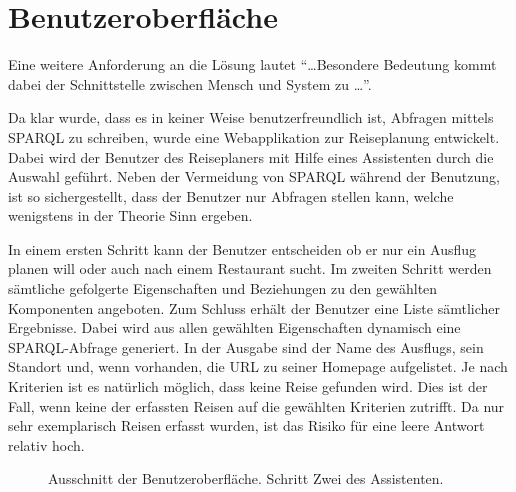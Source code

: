 \section{Benutzeroberfläche}
\label{sec:loesung_gui}
Eine weitere Anforderung an die Lösung lautet ``\ldots Besondere Bedeutung kommt dabei der Schnittstelle zwischen Mensch und System zu \ldots''.~\cite{Aufgabenstellung}

Da klar wurde, dass es in keiner Weise benutzerfreundlich ist, Abfragen mittels SPARQL zu schreiben, wurde eine Webapplikation zur Reiseplanung entwickelt. Dabei wird der Benutzer des Reiseplaners mit Hilfe eines Assistenten durch die Auswahl geführt. Neben der Vermeidung von SPARQL während der Benutzung, ist so sichergestellt, dass der Benutzer nur Abfragen stellen kann, welche wenigstens in der Theorie Sinn ergeben.

In einem ersten Schritt kann der Benutzer entscheiden ob er nur ein Ausflug planen will oder auch nach einem Restaurant sucht. Im zweiten Schritt werden sämtliche gefolgerte Eigenschaften und Beziehungen zu den gewählten Komponenten angeboten. Zum Schluss erhält der Benutzer eine Liste sämtlicher Ergebnisse. Dabei wird aus allen gewählten Eigenschaften dynamisch eine SPARQL-Abfrage generiert. In der Ausgabe sind der Name des Ausflugs, sein Standort und, wenn vorhanden, die URL zu seiner Homepage aufgelistet. Je nach Kriterien ist es natürlich möglich, dass keine Reise gefunden wird. Dies ist der Fall, wenn keine der erfassten Reisen auf die gewählten Kriterien zutrifft. Da nur sehr exemplarisch Reisen erfasst wurden, ist das Risiko für eine leere Antwort relativ hoch.
\begin{figure}[H]
\centering {}
\caption{Ausschnitt der Benutzeroberfläche. Schritt Zwei des Assistenten.\label{fig:gui}\protect\footnotemark}
\end{figure}
